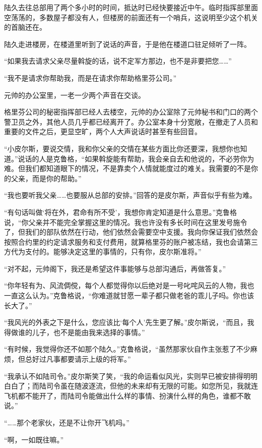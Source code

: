 陆久去往总部用了两个多小时的时间，抵达时已经快要接近中午。临时指挥部里面空荡荡的，多数屋子都没有人，但楼房的前面还有一个哨兵，这说明至少这个机关的首脑还在。

陆久走进楼房，在楼道里听到了说话的声音，于是他在楼道口驻足倾听了一阵。

“如果我去请求父亲尽量斡旋的话，说不定军方那边，也不是非要把您……”

“我不是请求你帮助我，而是在请求你帮助格里芬公司。”

元帅的办公室里，一老一少两个声音在交谈。

格里芬公司的秘密指挥部已经人去楼空，元帅的办公室除了元帅秘书和门口的两个警卫员之外，其他人员几乎都已经离开了。办公室本身十分宽敞，在撤走了人员和重要的文件之后，更显空旷，两个人大声说话时甚至有些回音。

“小皮尔斯，要说交情，我和你父亲的交情在某些方面比你还要深，我想你也知道。”说话的人是克鲁格，“如果斡旋能有帮助，我会亲自去和他说的，不必劳你为难。但我们都知道眼下的情况，不是靠卖个人情就能度过的难关。我需要的不是你的父亲，而是你的帮助。”

“我也要听我父亲……也要服从总部的安排。”回答的是皮尔斯，声音似乎有些为难。

“有句话叫做‘将在外，君命有所不受’，我想你肯定知道是什么意思。”克鲁格说，“你父亲并不能完全掌握这里的情况。我也许没有多长时间在这里发号施令了，但我们的部队依然在行动，他们依然会需要空中支援。我向你保证我们依然会按照合约里的约定请求服务和支付费用，就算格里芬的账户被冻结，我也会请第三方代为支付的。能够决定这里的事情的，只有你，皮尔斯准将。”

“对不起，元帅阁下，我还是希望这件事能够与总部沟通后，再做答复。”

“你年轻有为、风流倜傥，每个人都觉得你以后绝对是一号叱咤风云的人物，我也一直这么认为。”克鲁格说，“你难道就甘愿一辈子都只做老爸的乖儿子吗。你也该长大了。”

“我风光的外表之下是什么，您应该比‘每个人’先生更了解。”皮尔斯说，“而且，我得做谁的儿子，也不是能由我来选择的事情。”

“有时候，我觉得你还不如那个陆久。”克鲁格说，“虽然那家伙自作主张惹了不少麻烦，但总好过凡事都要请示上级的将军。”

“我承认不如陆司令。”皮尔斯笑了笑，“我的命运看似风光，实则早已被安排得明明白白了；而陆司令虽在随波逐流，但他的未来却有无限的可能。如您所见，我就连飞机都不能开了，而陆司令能做出什么样的事情、扮演什么样的角色，谁都不敢说。”

“……那个老家伙，还是不让你开飞机吗。”

“啊，一如既往嘛。”

